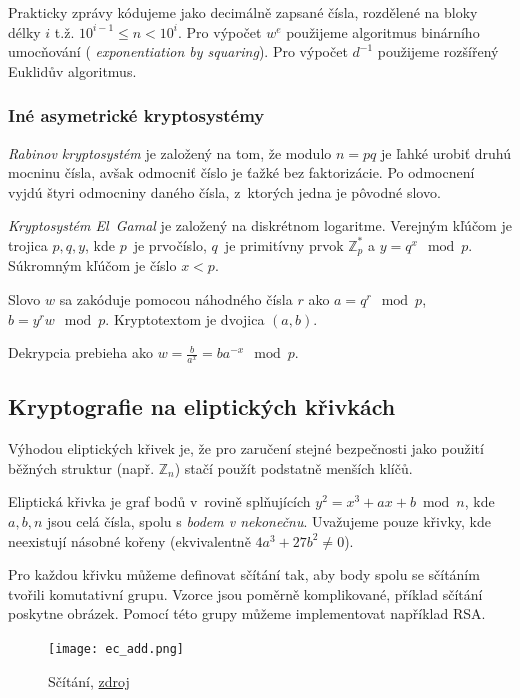 Prakticky zprávy kódujeme jako decimálně zapsané čísla,
rozdělené na bloky délky $i$ t.ž. $10^{i-1} \leq n < 10^i$.
Pro výpočet $w^e$ použijeme algoritmus binárního umocňování ({\em
exponentiation by squaring}).
Pro výpočet $d^{-1}$ použijeme rozšířený Euklidův
algoritmus.


\subsubsection{Iné asymetrické kryptosystémy}
{\em Rabinov kryptosystém} je založený na tom, že modulo $n=pq$ je ľahké urobiť druhú
mocninu čísla, avšak odmocniť číslo je ťažké bez faktorizácie. Po odmocnení
vyjdú štyri odmocniny daného čísla, z~ktorých jedna je pôvodné slovo.

{\em Kryptosystém El~Gamal} je založený na diskrétnom logaritme. 
Verejným kľúčom je trojica $p,q,y$, kde $p$~je prvočíslo, $q$~je 
primitívny prvok $\mathbb{Z}^*_p$ a $y=q^x \mod p$. Súkromným kľúčom
je číslo $x < p$.

Slovo $w$ sa zakóduje pomocou náhodného čísla $r$ ako $a=q^r \mod p$,
$b=y^r w \mod p$. Kryptotextom je dvojica $(a,b)$.

Dekrypcia prebieha ako $w = \frac{b}{a^x}=ba^{-x}\mod p$.

\subsection{Kryptografie na eliptických křivkách}

Výhodou eliptických křivek je,
že pro zaručení stejné bezpečnosti jako použití běžných struktur (např.
$\mathbb{Z}_n$) stačí použít podstatně menších klíčů.

Eliptická křivka je graf bodů v~rovině splňujících
$y^2 = x^3 + ax + b \bmod n$, kde $a,b,n$ jsou celá čísla,
spolu s {\em bodem v nekonečnu}. Uvažujeme pouze křivky, kde neexistují
násobné kořeny (ekvivalentně $4a^3 + 27b^2 \neq 0$).

Pro každou křivku můžeme definovat sčítání tak, aby body spolu se
sčítáním tvořili komutativní grupu. Vzorce jsou poměrně komplikované,
příklad sčítání poskytne obrázek. Pomocí této grupy můžeme implementovat
například RSA.

\begin{figure}[H]
    \centering
    \texttt{[image: ec\_add.png]}
    \caption{Sčítání, \href{https://www.certicom.com/content/certicom/en/21-elliptic-curve-addition-a-geometric-approach.html}{zdroj}}
\end{figure}

